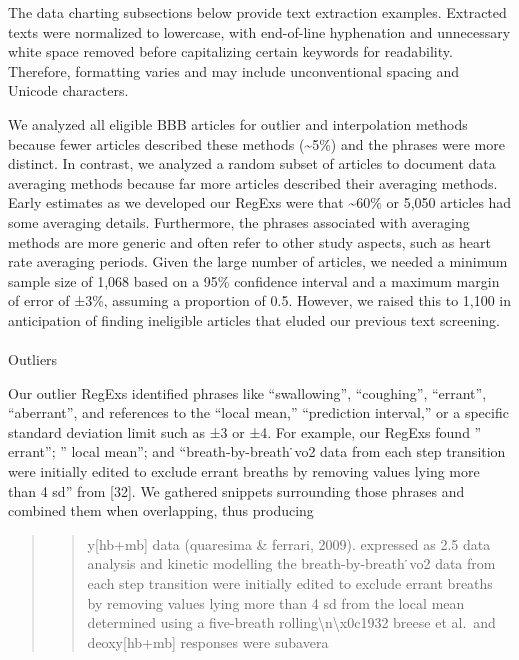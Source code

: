 \documentclass[
  letterpaper,
  DIV=11,
  numbers=noendperiod]{scrartcl}
\makeatletter
\let\oldparagraph\paragraph
\renewcommand{\paragraph}{
    \@ifstar
      \xxxParagraphStar
      \xxxParagraphNoStar
  }
\newcommand{\xxxParagraphStar}[1]{\oldparagraph*{#1}\mbox{}}
\newcommand{\xxxParagraphNoStar}[1]{\oldparagraph{#1}\mbox{}}
\makeatother
\begin{document}
The data charting subsections below provide text extraction examples.
Extracted texts were normalized to lowercase, with end-of-line
hyphenation and unnecessary white space removed before capitalizing
certain keywords for readability. Therefore, formatting varies and may
include unconventional spacing and Unicode characters.

We analyzed all eligible BBB articles for outlier and interpolation
methods because fewer articles described these methods
(\textasciitilde5\%) and the phrases were more distinct. In contrast, we
analyzed a random subset of articles to document data averaging methods
because far more articles described their averaging methods. Early
estimates as we developed our RegExs were that \textasciitilde60\% or
5,050 articles had some averaging details. Furthermore, the phrases
associated with averaging methods are more generic and often refer to
other study aspects, such as heart rate averaging periods. Given the
large number of articles, we needed a minimum sample size of 1,068 based
on a 95\% confidence interval and a maximum margin of error of ±3\%,
assuming a proportion of 0.5. However, we raised this to 1,100 in
anticipation of finding ineligible articles that eluded our previous
text screening.

\paragraph{Outliers}\label{outliers}

Our outlier RegExs identified phrases like ``swallowing'', ``coughing'',
``errant'', ``aberrant'', and references to the ``local mean,''
``prediction interval,'' or a specific standard deviation limit such as
±3 or ±4. For example, our RegExs found '' errant''; '' local mean'';
and ``breath-by-breath ̇vo2 data from each step transition were
initially edited to exclude errant breaths by removing values lying more
than 4 sd'' from {[}32{]}. We gathered snippets surrounding those
phrases and combined them when overlapping, thus producing

\begin{quote}
\begin{quote}
y{[}hb+mb{]} data (quaresima \& ferrari, 2009). expressed as 2.5 data
analysis and kinetic modelling the breath-by-breath ̇vo2 data from each
step transition were initially edited to exclude errant breaths by
removing values lying more than 4 sd from the local mean determined
using a five-breath rolling\textbackslash n\textbackslash x0c1932 breese
et al.~and deoxy{[}hb+mb{]} responses were subavera
\end{quote}
\end{quote}
\end{document}
